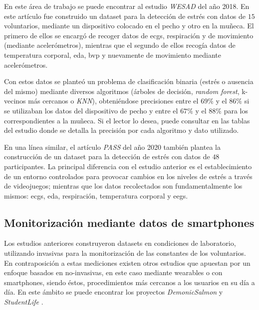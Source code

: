         En este área de trabajo se puede encontrar al estudio \textit{WESAD} \cite{schmidt_introducing_2018} del año 2018. En este artículo fue construido un \gls{dataset} para la detección de estrés con datos de $15$ voluntarios, mediante un dispositivo colocado en el pecho y otro en la muñeca. El primero de ellos se encargó de recoger datos de \glspl{ecg}, respiración y de movimiento (mediante acelerómetros), mientras que el segundo de ellos recogía datos de temperatura corporal, \gls{eda}, \gls{bvp} y nuevamente de movimiento mediante acelerómetros.

        Con estos datos se planteó un problema de clasificación binaria (estrés o ausencia del mismo) mediante diversos algoritmos (árboles de decisión, \textit{random forest}, k-vecinos más cercanos o \textit{KNN}), obteniéndose precisiones entre el $69\%$ y el $86\%$ si se utilizaban los datos del dispositivo de pecho y entre el $67\%$ y el $88\%$ para los correspondientes a la muñeca. Si el lector lo desea, puede consultar en \cite{schmidt_introducing_2018} las tablas del estudio donde se detalla la precisión por cada algoritmo y dato utilizado.

        En una línea similar, el artículo \textit{PASS} \cite{parent_pass_2020} del año 2020 también plantea la construcción de un \gls{dataset} para la detección de estrés con datos de $48$ participantes. La principal diferencia con el estudio anterior es el establecimiento de un entorno controlados para provocar cambios en los niveles de estrés a través de videojuegos; mientras que los datos recolectados son fundamentalmente los mismos: \glspl{ecg}, \gls{eda}, respiración, temperatura corporal y \glspl{eeg}.

    \subsection{Monitorización mediante datos de smartphones}
        \label{sec:estado_arte:smartphone}

        Los estudios anteriores construyeron \glspl{dataset} en condiciones de laboratorio, utilizando \glspl{invasiva} para la monitorización de las constantes de los voluntarios. En contraposición a estas mediciones existen otros estudios que apuestan por un enfoque basados en \glspl{no-invasiva}, en este caso mediante \glspl{wearable} o con \glspl{smartphone}, siendo éstos, procedimientos más cercanos a los usuarios en su día a día. En este ámbito se puede encontrar los proyectos \textit{DemonicSalmon} \cite{boukhechba_demonicsalmon_2018} y \textit{StudentLife} \cite{rui_studentlife_2014}.

